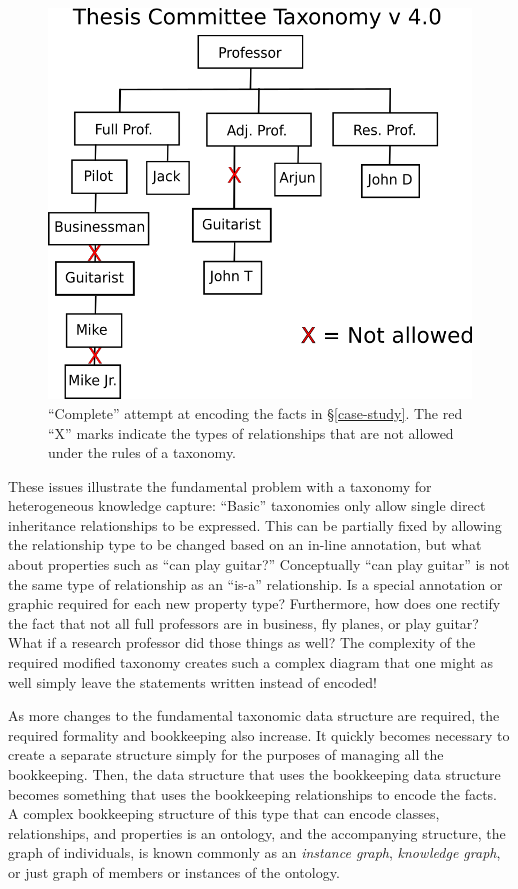 \begin{figure}[htbp]
\centering
\includegraphics[width=\textwidth]{figures/tc-tax-v4-wErrors.png}
\caption{``Complete'' attempt at encoding the facts in \S \ref{case-study}.
The red ``X'' marks indicate the types of relationships that are not allowed
under the rules of a taxonomy.} 
\label{tax-2}
\end{figure}

These issues illustrate the fundamental problem with a taxonomy for
heterogeneous knowledge capture: ``Basic'' taxonomies only allow single direct
inheritance relationships to be expressed. This can be partially fixed by
allowing the relationship type to be changed based on an in-line annotation, but
what about properties such as ``can play guitar?'' Conceptually ``can play
guitar'' is not the same type of relationship as an ``is-a'' relationship. Is
a special annotation or graphic required for each new property type?
Furthermore, how does one rectify the fact that not all full professors are in
business, fly planes, or play guitar? What if a research professor did those
things as well? The complexity of the required modified taxonomy creates such a
complex diagram that one might as well simply leave the statements written
instead of encoded!

As more changes to the fundamental taxonomic data structure are required, the
required formality and bookkeeping also increase. It quickly becomes necessary
to create a separate structure simply for the purposes of managing all the
bookkeeping. Then, the data structure that uses the bookkeeping data structure
becomes something that uses the bookkeeping relationships to encode the facts.
A complex bookkeeping structure of this type that can encode classes,
relationships, and properties is an ontology, and the accompanying structure,
the graph of individuals, is known commonly as an \textit{instance graph},
\textit{knowledge graph}, or just graph of members or instances of the
ontology.


